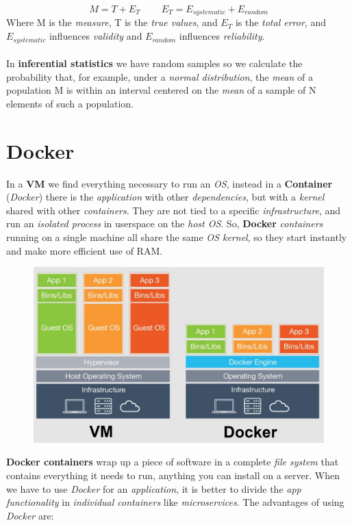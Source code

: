 \documentclass{article}
\begin{document}
\[ M = T + E_T \;\;\;\;\;\;\;\;  E_T= E_{systematic} + E_{random} \] 
Where M is the \emph{measure}, T is the \emph{true values}, and $E_T$ is the \emph{total error}, and $E_{systematic}$ influences \emph{validity} and $ E_{random}$ influences \emph{reliability}.\\\\
In \textbf{inferential statistics} we have random samples so we calculate the probability that, for example, under a \emph{normal distribution}, the \emph{mean} of a population M is within an interval centered on the \emph{mean} of a sample of N elements of such a population.
\clearpage
\section{Docker}
In a \textbf{VM} we find everything necessary to run an \emph{OS}, instead in a \textbf{Container} (\emph{Docker}) there is the \emph{application} with other \emph{dependencies}, but with a \emph{kernel} shared with other \emph{containers}. They are not tied to a specific \emph{infrastructure}, and run an \emph{isolated process} in userspace on the \emph{host OS}. So, \textbf{Docker} \emph{containers} running on a single machine all share the same \emph{OS kernel}, so they start instantly and make more efficient use of RAM. 
\begin{figure}[H]
  \centering
  \includegraphics[scale=0.4]{cattura6.png}
\end{figure}
\hfill \break
\textbf{Docker containers} wrap up a piece of software in a complete \emph{file system} that contains everything it needs to run, anything you can install on a server. When we have to use \emph{Docker} for an \emph{application}, it is better to divide the \emph{app functionality} in \emph{individual containers} like \emph{microservices}. The advantages of using \emph{Docker} are:
\end{document}
